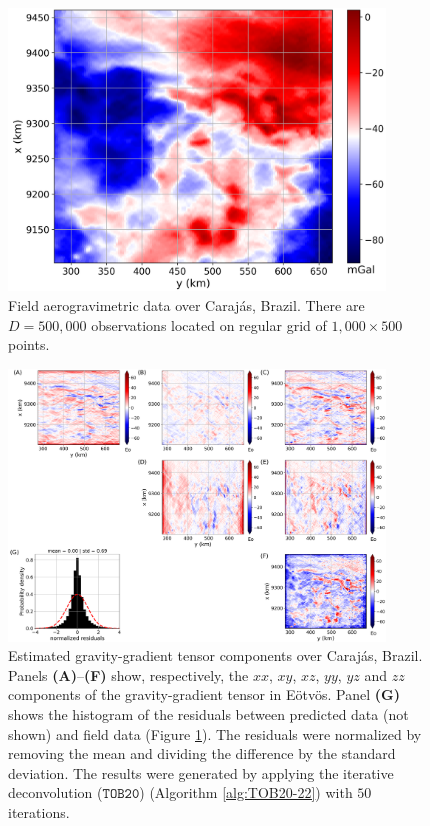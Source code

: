 \begin{figure}[htbp]
	\begin{center}
		\includegraphics[width=10cm]{Fig/carajas_data}
	\end{center}
	\caption{
		Field aerogravimetric data over Caraj{\'a}s, Brazil. 
		There are $D = 500, 000$ observations located on regular grid of $1,000 \times 500$ points.
		}
	\label{fig:carajas-data}
\end{figure}

\begin{figure}[htbp]
	\begin{center}
		\includegraphics[width=10cm]{Fig/carajas_grav_gradient}
	\end{center}
	\caption{
		Estimated gravity-gradient tensor components over Caraj{\'a}s, Brazil.
		Panels \textbf{(A)}--\textbf{(F)} show, respectively, the $xx$, $xy$, $xz$, $yy$, $yz$ and
		$zz$ components of the gravity-gradient tensor in E{\"o}tv{\"o}s.
		Panel \textbf{(G)} shows the histogram of the residuals between predicted data (not shown) and field data 
		(Figure \ref{fig:carajas-data}). 
		The residuals were normalized by removing the mean and dividing the difference
		by the standard deviation.
		The results were generated by applying the iterative deconvolution ($\mathtt{TOB20}$)
		(Algorithm \ref{alg:TOB20-22})
		with $50$ iterations.
		}
	\label{fig:carajas-grav-gradient}
\end{figure}

